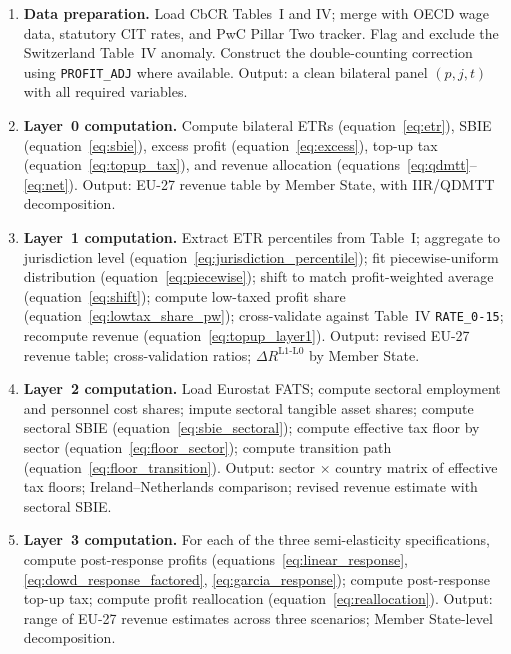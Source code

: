 \documentclass[11pt,a4paper]{article}
\newcommand{\code}[1]{\texttt{#1}}
\begin{document}
\begin{enumerate}
\item \textbf{Data preparation.} Load CbCR Tables~I and IV; merge with OECD wage data, statutory CIT rates, and PwC Pillar Two tracker. Flag and exclude the Switzerland Table~IV anomaly. Construct the double-counting correction using \code{PROFIT\_ADJ} where available. Output: a clean bilateral panel $(p, j, t)$ with all required variables.

\item \textbf{Layer~0 computation.} Compute bilateral ETRs (equation~\ref{eq:etr}), SBIE (equation~\ref{eq:sbie}), excess profit (equation~\ref{eq:excess}), top-up tax (equation~\ref{eq:topup_tax}), and revenue allocation (equations~\ref{eq:qdmtt}--\ref{eq:net}). Output: EU-27 revenue table by Member State, with IIR/QDMTT decomposition.

\item \textbf{Layer~1 computation.} Extract ETR percentiles from Table~I; aggregate to jurisdiction level (equation~\ref{eq:jurisdiction_percentile}); fit piecewise-uniform distribution (equation~\ref{eq:piecewise}); shift to match profit-weighted average (equation~\ref{eq:shift}); compute low-taxed profit share (equation~\ref{eq:lowtax_share_pw}); cross-validate against Table~IV \code{RATE\_0-15}; recompute revenue (equation~\ref{eq:topup_layer1}). Output: revised EU-27 revenue table; cross-validation ratios; $\Delta R^{\text{L1-L0}}$ by Member State.

\item \textbf{Layer~2 computation.} Load Eurostat FATS; compute sectoral employment and personnel cost shares; impute sectoral tangible asset shares; compute sectoral SBIE (equation~\ref{eq:sbie_sectoral}); compute effective tax floor by sector (equation~\ref{eq:floor_sector}); compute transition path (equation~\ref{eq:floor_transition}). Output: sector $\times$ country matrix of effective tax floors; Ireland--Netherlands comparison; revised revenue estimate with sectoral SBIE.

\item \textbf{Layer~3 computation.} For each of the three semi-elasticity specifications, compute post-response profits (equations~\ref{eq:linear_response}, \ref{eq:dowd_response_factored}, \ref{eq:garcia_response}); compute post-response top-up tax; compute profit reallocation (equation~\ref{eq:reallocation}). Output: range of EU-27 revenue estimates across three scenarios; Member State-level decomposition.
\end{enumerate}
\end{document}
